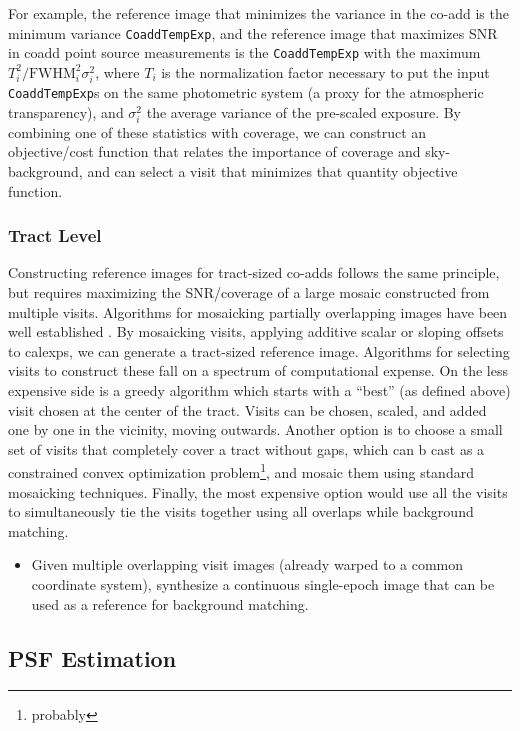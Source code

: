 For example, the reference image that minimizes the variance in the co-add is the minimum variance \texttt{CoaddTempExp}, and
the reference image that maximizes SNR in coadd point source measurements is the \texttt{CoaddTempExp} with the maximum
$T^2_i/\mathrm{FWHM}^2_i \sigma^2_i$, where $T_i$ is
the normalization factor necessary to put the input \texttt{CoaddTempExp}s on the same photometric system (a proxy for the atmospheric transparency),
and $\sigma^2_i$ the average variance of the pre-scaled exposure.  By combining one of
these statistics with coverage, we can construct an objective/cost function that relates the importance of
coverage and sky-background, and can select a visit that minimizes that quantity objective function.

\subsubsection{Tract Level}
Constructing reference images for tract-sized co-adds follows the same principle, but requires maximizing the
SNR/coverage of a large mosaic constructed from multiple visits.  Algorithms for mosaicking partially
overlapping images have been well established \citep[e.g.][]{2014AJ....147..109S, 2008ASPC..394...83B}. By mosaicking visits,
applying additive scalar or sloping offsets to calexps, we can generate a tract-sized reference image.
Algorithms for selecting visits to construct these fall on a spectrum of computational expense. On the less
expensive side is a greedy algorithm which starts with a ``best'' (as defined above) visit chosen at the
center of the tract.  Visits can be chosen, scaled, and added one by one in the vicinity, moving outwards.
Another option is to choose a small set of visits that completely cover a tract without gaps, which can b
cast as a constrained convex optimization problem\footnote{probably}, and mosaic them using standard
mosaicking techniques.  Finally, the most expensive option would use all the visits to simultaneously tie the
visits together using all overlaps while background matching.

\begin{itemize}
\item Given multiple overlapping visit images (already warped to a common coordinate system), synthesize a continuous single-epoch image that can be used as a reference for background matching.
\end{itemize}

\subsection{PSF Estimation}
\label{sec:acPSFEstimation}

